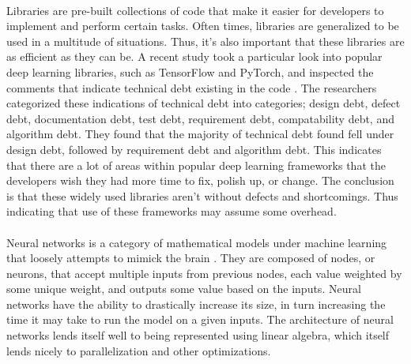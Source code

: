 \documentclass[12pt]{article}
\begin{document}

\paragraph{}
Libraries are pre-built collections of code that make it easier for developers to implement and perform certain tasks.
Often times, libraries are generalized to be used in a multitude of situations.
Thus, it's also important that these libraries are as efficient as they can be.
A recent study took a particular look into popular deep learning libraries, such as TensorFlow and PyTorch, and inspected the comments that indicate technical debt existing in the code \cite{article_deep_learning_framework_debt}.
The researchers categorized these indications of technical debt into categories; design debt, defect debt, documentation debt, test debt, requirement debt, compatability debt, and algorithm debt.
They found that the majority of technical debt found fell under design debt, followed by requirement debt and algorithm debt.
This indicates that there are a lot of areas within popular deep learning frameworks that the developers wish they had more time to fix, polish up, or change.
The conclusion is that these widely used libraries aren't without defects and shortcomings.
Thus indicating that use of these frameworks may assume some overhead.



\paragraph{}
Neural networks is a category of mathematical models under machine learning that loosely attempts to mimick the brain \cite{book_intro_neural_networks}.
They are composed of nodes, or neurons, that accept multiple inputs from previous nodes, each value weighted by some unique weight, and outputs some value based on the inputs.
Neural networks have the ability to drastically increase its size, in turn increasing the time it may take to run the model on a given inputs.
The architecture of neural networks lends itself well to being represented using linear algebra, which itself lends nicely to parallelization and other optimizations.
\end{document}
